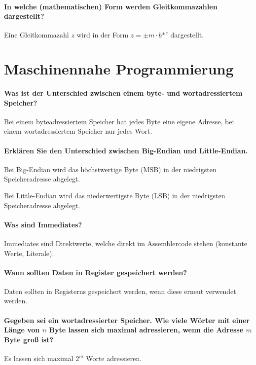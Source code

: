 \paragraph{In welche (mathematischen) Form werden Gleitkommazahlen dargestellt?}
	Eine Gleitkommazahl $ z $ wird in der Form $ z = \pm m \cdot b ^ { \pm e } $ dargestellt.

\section{Maschinennahe Programmierung}
\paragraph{Was ist der Unterschied zwischen einem byte- und wortadressiertem Speicher?}
Bei einem byteadressiertem Speicher hat jedes Byte eine eigene Adresse, bei einem wortadressiertem Speicher nur jedes Wort.

\paragraph{Erklären Sie den Unterschied zwischen Big-Endian und Little-Endian.}
Bei Big-Endian wird das höchstwertige Byte (MSB) in der niedrigsten Speicheradresse abgelegt.

Bei Little-Endian wird das niederwertigste Byte (LSB) in der niedrigsten Speicheradresse abgelegt.

\paragraph{Was sind Immediates?}
Immediates sind Direktwerte, welche direkt im Assemblercode stehen (konstante Werte, Literale).

\paragraph{Wann sollten Daten in Register gespeichert werden?}
Daten sollten in Registerns gespeichert werden, wenn diese erneut verwendet werden.

\paragraph{Gegeben sei ein wortadressierter Speicher. Wie viele Wörter mit einer Länge von $ n $ Byte lassen sich maximal adressieren, wenn die Adresse $ m $ Byte groß ist?}
Es lassen sich maximal $ 2 ^ m $ Worte adressieren.

